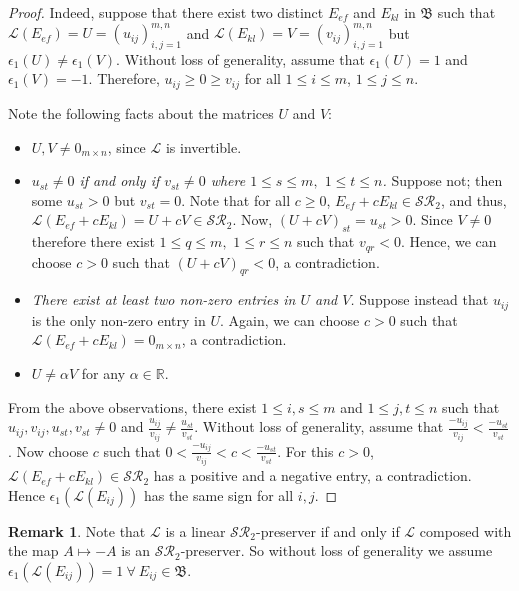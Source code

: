 \documentclass[11pt,reqno]{amsart}
\theoremstyle{plain}
\theoremstyle{definition}
\newtheorem{rem}[theorem]{Remark}
\numberwithin{equation}{section}
\begin{document}
\begin{proof}
	Indeed, suppose that there exist two distinct $E_{ef}$ and $E_{kl}$ in $\mathfrak{B}$ such that $\mathcal{L}(E_{ef})=U=(u_{ij})_{i,j=1}^{m,n}$ and $\mathcal{L}(E_{kl})=V=(v_{ij})_{i,j=1}^{m,n}$ but $\epsilon_1(U)\neq\epsilon_1(V)$. Without loss of generality, assume that $\epsilon_1(U)=1$ and $\epsilon_1(V)=-1$. Therefore, $u_{ij}\geq 0\geq v_{ij}$ for all $1\leq i\leq m$, $1\leq j\leq n$.
	
	Note the following facts about the matrices $U$ and $V$:
	\begin{itemize}
		\item[(i)] $U, V\neq0_{m\times n}$, since $\mathcal{L}$ is invertible.
		
		\item[(ii)] \textit{$u_{st}\neq0$ if and only if $v_{st}\neq0$ where $1\leq s\leq m,$ $1\leq t\leq n$.} Suppose not; then some $u_{st}>0$ but $v_{st}=0$. Note that for all $c\geq0$, $E_{ef}+cE_{kl}\in \mathcal{SR}_2$, and thus, $\mathcal{L}(E_{ef}+cE_{kl})=U+cV\in \mathcal{SR}_2$. Now, $(U+cV)_{st}=u_{st}>0$. Since $V\neq0$ therefore there exist $1\leq q\leq m,$ $1\leq r\leq n$ such that $v_{qr}<0$. Hence, we can choose $c>0$ such that $(U+cV)_{qr}<0$, a contradiction.
		
		\item[(iii)] \textit{There exist at least two non-zero entries in $U$ and $V$.} Suppose instead that $u_{ij}$ is the only non-zero entry in $U$. Again, we can choose $c>0$ such that $\mathcal{L}(E_{ef}+cE_{kl})=0_{m\times n}$, a contradiction.
		
		\item[(iv)] $U\neq\alpha V$ for any $\alpha\in\mathbb{R}$.
	\end{itemize}
	From the above observations, there exist $1\leq i,s\leq m$ and $1\leq j,t\leq n$ such that $u_{ij}, v_{ij}, u_{st}, v_{st}\neq0$ and $\frac{u_{ij}}{v_{ij}}\neq\frac{u_{st}}{v_{st}}$. Without loss of generality, assume that $\frac{-u_{ij}}{v_{ij}}<\frac{-u_{st}}{v_{st}}$. Now choose $c$ such that $0<\frac{-u_{ij}}{v_{ij}}<c<\frac{-u_{st}}{v_{st}}$. For this $c>0$, $\mathcal{L}(E_{ef}+cE_{kl})\in \mathcal{SR}_2$ has a positive and a negative entry, a contradiction. Hence $\epsilon_1(\mathcal{L}(E_{ij}))$ has the same sign for all $i,j$.
\end{proof}

\begin{rem}\label{Ato-Awlog}
	Note that $\mathcal{L}$ is a linear $\mathcal{SR}_2$-preserver if and only if $\mathcal{L}$ composed with the map $A\mapsto-A$ is an $\mathcal{SR}_2$-preserver. So without loss of generality we assume $\epsilon_1(\mathcal{L}(E_{ij}))=1\ \forall~E_{ij}\in\mathfrak{B}$.
\end{rem} 
\end{document}
